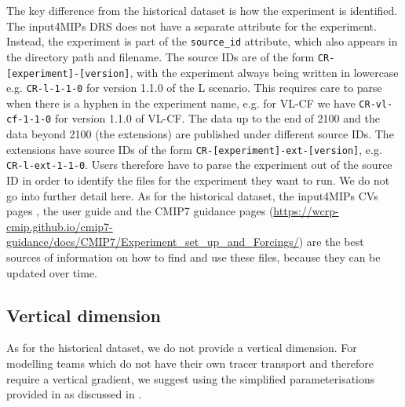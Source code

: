 The key difference from the historical dataset is how the experiment is identified.
The input4MIPs DRS does not have a separate attribute for the experiment.
Instead, the experiment is part of the \texttt{source\_id} attribute,
which also appears in the directory path and filename.
The source IDs are of the form \texttt{CR-[experiment]-[version]},
with the experiment always being written in lowercase
e.g. \texttt{CR-l-1-1-0} for version 1.1.0 of the L scenario.
This requires care to parse when there is a hyphen in the experiment name,
e.g. for VL-CF we have \texttt{CR-vl-cf-1-1-0} for version 1.1.0 of VL-CF.
The data up to the end of 2100 and the data beyond 2100 (the extensions) are published under different source IDs.
The extensions have source IDs of the form \texttt{CR-[experiment]-ext-[version]},
e.g. \texttt{CR-l-ext-1-1-0}.
Users therefore have to parse the experiment out of the source ID
in order to identify the files for the experiment they want to run.
We do not go into further detail here.
As for the historical dataset,
the input4MIPs CVs pages \citep{input4mips-cvs_docs_2026},
the user guide \citep{nicholls_scenario-user-guide_2026}
and the CMIP7 guidance pages
(\mbox{\url{https://wcrp-cmip.github.io/cmip7-guidance/docs/CMIP7/Experiment_set_up_and_Forcings/}})
are the best sources of information on how to find and use these files,
because they can be updated over time.

\subsection{Vertical dimension}
\label{ssec:methods-vertical}

As for the historical dataset,
we do not provide a vertical dimension.
For modelling teams which do not have their own tracer transport and therefore require a vertical gradient,
we suggest using the simplified parameterisations provided in \citet{meinshausen_historical-ghgs_2017}
as discussed in \citet{nicholls_historical-ghgs_2026}.
